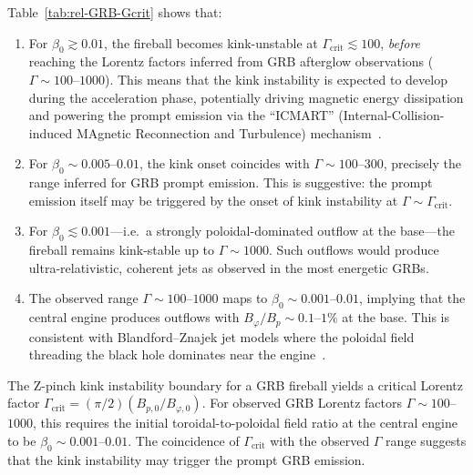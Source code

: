 \noindent
Table~\ref{tab:rel-GRB-Gcrit} shows that:
\begin{enumerate}
\item For $\beta_{0} \gtrsim 0.01$, the fireball becomes
  kink-unstable at $\Gamma_{\mathrm{crit}} \lesssim 100$,
  \emph{before} reaching the Lorentz factors inferred from
  GRB afterglow observations ($\Gamma \sim 100$--$1000$).
  This means that the kink instability is expected to develop
  during the acceleration phase, potentially driving magnetic
  energy dissipation and powering the prompt emission via
  the ``ICMART'' (Internal-Collision-induced MAgnetic
  Reconnection and Turbulence) mechanism~\citep{Zhang2011}.

\item For $\beta_{0} \sim 0.005$--$0.01$, the kink onset
  coincides with $\Gamma \sim 100$--$300$, precisely the range
  inferred for GRB prompt emission.  This is suggestive: the
  prompt emission itself may be triggered by the onset of kink
  instability at $\Gamma \sim \Gamma_{\mathrm{crit}}$.

\item For $\beta_{0} \lesssim 0.001$---i.e.\ a strongly
  poloidal-dominated outflow at the base---the fireball
  remains kink-stable up to $\Gamma \sim 1000$.  Such outflows
  would produce ultra-relativistic, coherent jets as observed in
  the most energetic GRBs.

\item The observed range $\Gamma \sim 100$--$1000$ maps to
  $\beta_{0} \sim 0.001$--$0.01$, implying that the central
  engine produces outflows with $B_{\varphi}/B_{p} \sim
  0.1$--$1\%$ at the base.  This is consistent with
  Blandford--Znajek jet models where the poloidal field
  threading the black hole dominates near the
  engine~\citep{Blandford1977}.
\end{enumerate}

\begin{relcorrection}
The Z-pinch kink instability boundary for a GRB fireball
yields a critical Lorentz factor
$\Gamma_{\mathrm{crit}} = (\pi/2)(B_{p,0}/B_{\varphi,0})$.
For observed GRB Lorentz factors $\Gamma \sim 100$--$1000$,
this requires the initial toroidal-to-poloidal field ratio at
the central engine to be $\beta_{0} \sim 0.001$--$0.01$.
The coincidence of $\Gamma_{\mathrm{crit}}$ with the observed
$\Gamma$ range suggests that the kink instability may trigger
the prompt GRB emission.
\end{relcorrection}

